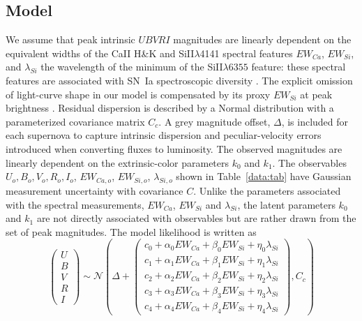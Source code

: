 \documentclass{aastex61}   	%
\begin{document}
\subsection{Model}
We assume 
that  peak intrinsic $UBVRI$ magnitudes are linearly dependent
on the
 equivalent widths of the CaII H\&K and SiII$\lambda$4141 spectral features
$EW_{Ca}$, $EW_{Si}$,
and $\lambda_{Si}$ the wavelength of the minimum of 
the SiII$\lambda6355$ feature:
these spectral features are associated with SN~Ia  spectroscopic diversity  
\citep{2006PASP..118..560B, 2008A&A...492..535A, 2009A&A...500L..17B, 2009PASP..121..238B, 2009ApJ...699L.139W, 2011ApJ...729...55F}.
The explicit omission of light-curve shape in our model is compensated by its proxy
$EW_{Si}$ at peak brightness
\citep{2008A&A...492..535A, 2011A&A...529L...4C}. 
Residual dispersion is described by a Normal distribution with a parameterized covariance matrix
$C_c$.  A grey magnitude offset, $\Delta$, is included for each supernova
to capture intrinsic dispersion and peculiar-velocity errors introduced when converting fluxes to luminosity.
The observed magnitudes are linearly dependent on the
extrinsic-color parameters $k_0$ and $k_1$.  
The observables
$U_o, B_o, V_o, R_o, I_o$, $EW_{Ca,o}$, $EW_{Si,o}$, $\lambda_{Si,o}$
shown in Table~\ref{data:tab} have Gaussian measurement uncertainty with covariance $C$.
Unlike the parameters associated with
the spectral measurements, $EW_{Ca}$, $EW_{Si}$ and $\lambda_{Si}$,  the latent
parameters $k_0$ and $k_1$ are not directly associated
with observables but are rather drawn from the set of peak magnitudes.
The model 
\color{red}
likelihood
\color{black}
is written as
\begin{equation}
\begin{pmatrix}
U\\B\\V\\R\\I
\end{pmatrix}
\sim \mathcal{N}
\left(
\Delta +
\begin{pmatrix}
c_0+\alpha_0 EW_{Ca} + \beta_0 EW_{Si} + \eta_0 \lambda_{Si} \\
c_1+\alpha_1 EW_{Ca} + \beta_1 EW_{Si} + \eta_1 \lambda_{Si}  \\
c_2+\alpha_2 EW_{Ca} + \beta_2 EW_{Si} + \eta_2 \lambda_{Si} \\
c_3+\alpha_3 EW_{Ca} + \beta_3 EW_{Si} + \eta_3 \lambda_{Si} \\
c_4+\alpha_4 EW_{Ca} + \beta_4 EW_{Si}+ \eta_4 \lambda_{Si}
\end{pmatrix}
,C_{c}
\right)
\label{ewsiv:eqn}
\end{equation}
\end{document}
